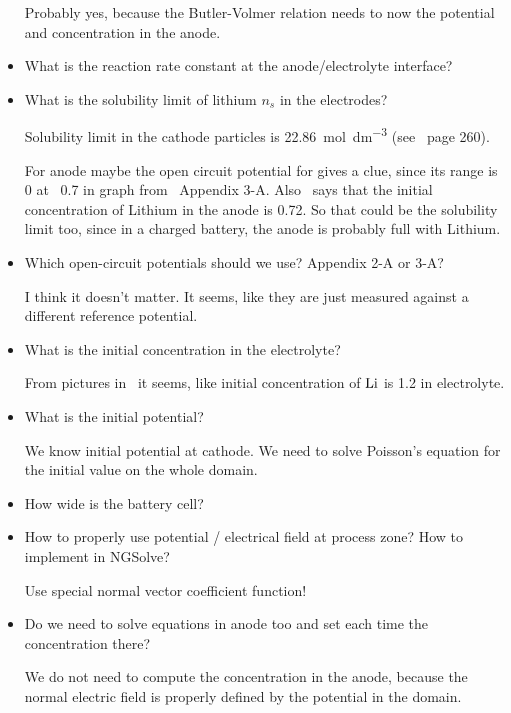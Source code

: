\documentclass[a4paper,11pt]{scrartcl}
\newcommand*{\Li}{\ce{Li}}
\begin{document}
\begin{itemize}
  Probably yes, because the Butler-Volmer relation needs to now the potential
  and concentration in the anode.

\item What is the reaction rate constant at the anode/electrolyte interface?

\item What is the solubility limit of lithium $n_s$ in the electrodes?

  Solubility limit in the cathode particles is \SI{22.86}{\mol\dm^{-3}}
  (see~\cite{garcia05} page 260).

  For anode maybe the open circuit potential for  gives a clue,
  since its range is 0 at ~0.7 in graph from~\cite{doyle95} Appendix 3-A.
  Also~\cite{garcia05} says that the initial concentration of Lithium in the
  anode is \num{0.72}.
  So that could be the solubility limit too, since in a charged battery, the
  anode is probably full with Lithium.

\item Which open-circuit potentials should we use? Appendix 2-A or 3-A?

  I think it doesn't matter.
  It seems, like they are just measured against a different reference potential.

\item What is the initial concentration in the electrolyte?

  From pictures in~\cite{garcia05} it seems, like initial concentration of $\Li$
  is \num{1.2} in electrolyte.

\item What is the initial potential?

  We know initial potential at cathode.
  We need to solve Poisson's equation for the initial value on the whole domain.

\item How wide is the battery cell?

\item How to properly use potential / electrical field at process zone?
  How to implement in NGSolve?

  Use special normal vector coefficient function!

\item Do we need to solve equations in anode too and set each time the concentration there?

  We do not need to compute the concentration in the anode, because the normal
  electric field is properly defined by the potential in the domain.


\end{itemize}
\end{document}
